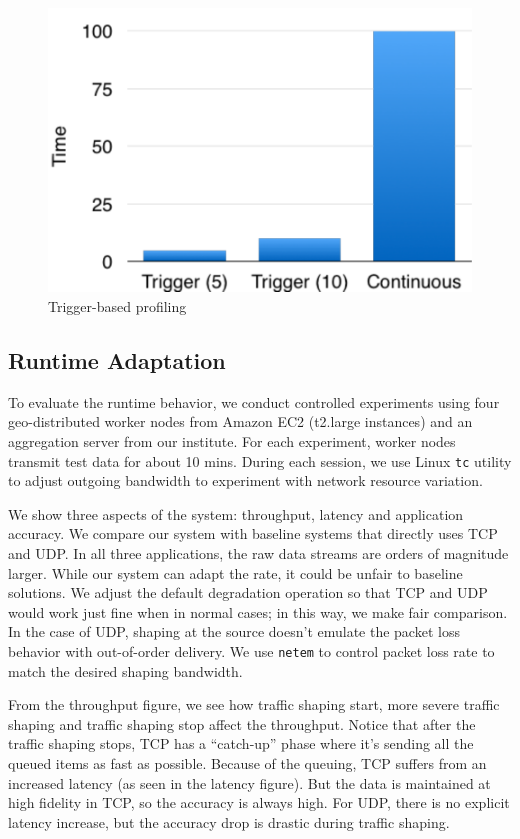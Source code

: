 \begin{figure}
  \centering
  \includegraphics[width=\columnwidth]{figures/trigger.pdf}
  \caption{Trigger-based profiling}
  \label{fig:trigger}
\end{figure}

\subsection{Runtime Adaptation}
\label{sec:runtime-adaptation}

To evaluate the runtime behavior, we conduct controlled experiments using four
geo-distributed worker nodes from Amazon EC2 (t2.large instances) and an
aggregation server from our institute. For each experiment, worker nodes
transmit test data for about 10 mins. During each session, we use Linux
\texttt{tc} utility to adjust outgoing bandwidth to experiment with network
resource variation.

We show three aspects of the system: throughput, latency and application
accuracy. We compare our system with baseline systems that directly uses TCP and
UDP. In all three applications, the raw data streams are orders of magnitude
larger. While our system can adapt the rate, it could be unfair to baseline
solutions. We adjust the default degradation operation so that TCP and UDP would
work just fine when in normal cases; in this way, we make fair comparison. In
the case of UDP, shaping at the source doesn't emulate the packet loss behavior
with out-of-order delivery. We use \texttt{netem} to control packet loss rate to
match the desired shaping bandwidth.

From the throughput figure, we see how traffic shaping start, more severe
traffic shaping and traffic shaping stop affect the throughput. Notice that
after the traffic shaping stops, TCP has a ``catch-up'' phase where it's sending
all the queued items as fast as possible. Because of the queuing, TCP suffers
from an increased latency (as seen in the latency figure). But the data is
maintained at high fidelity in TCP, so the accuracy is always high. For UDP,
there is no explicit latency increase, but the accuracy drop is drastic during
traffic shaping.

